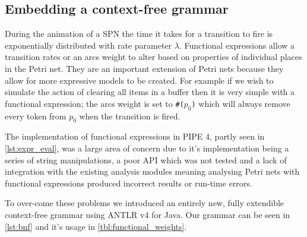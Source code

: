 \subsection{Embedding a context-free grammar}
During the animation of a SPN the time it takes for a transition to fire is exponentially distributed with rate parameter $\lambda$. Functional expressions allow a transition rates or an arcs weight to alter based on properties of individual places in the Petri net. They are an important extension of Petri nets because they allow for more expressive models to be created. For example if we wish to simulate the action of clearing all items in a buffer then it is very simple with a functional expression; the arcs weight is set to \texttt{\#($p_0$)} which will always remove every token from $p_0$ when the transition is fired.

The implementation of functional expressions in PIPE 4, partly seen in \cref{lst:expr_eval}, was a large area of concern due to it's implementation being a series of string manipulations, a poor API which was not tested and a lack of integration with the existing analysis modules meaning analysing Petri nets with functional expressions produced incorrect results or run-time errors.


To over-come these problems we introduced an entirely new, fully extendible context-free grammar using ANTLR v4 for Java. Our grammar can be seen in \cref{lst:bnf} and it's usage in \cref{tbl:functional_weights}.

